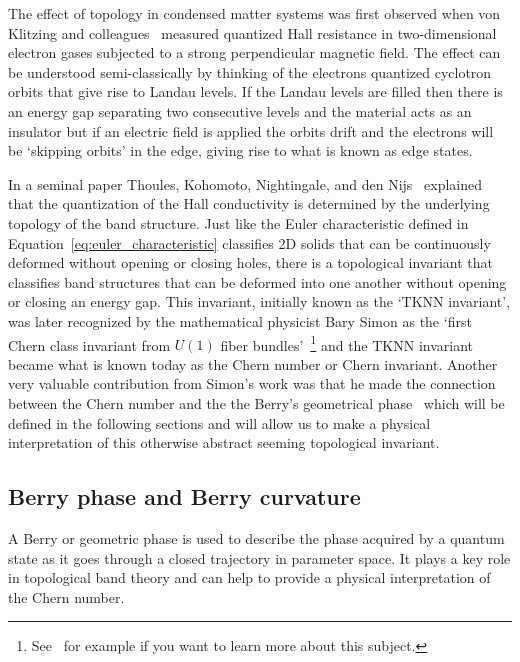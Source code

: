 The effect of topology in condensed matter systems was first observed when von Klitzing and colleagues~\cite{klitzing_new_1980} measured quantized Hall resistance in two-dimensional electron gases subjected to a strong perpendicular magnetic field. The effect can be understood semi-classically by thinking of the electrons quantized cyclotron orbits that give rise to Landau levels. If the Landau levels are filled then there is an energy gap separating two consecutive levels and the material acts as an insulator but if an electric field is applied the orbits drift and the electrons will be `skipping orbits' in the edge, giving rise to what is known as edge states. 

In a seminal paper Thoules, Kohomoto, Nightingale, and den Nijs~\cite{thouless_quantized_1982} explained that the quantization of the Hall conductivity is determined by the underlying topology of the band structure. Just like the Euler characteristic defined in Equation~\ref{eq:euler_characteristic} classifies 2D solids that can be continuously deformed without opening or closing holes, there is a topological invariant that classifies band structures that can be deformed into one another without opening or closing an energy gap. This invariant, initially known as the `TKNN invariant', was later recognized by the mathematical physicist Bary Simon as the `first Chern class invariant from $U(1)$ fiber bundles'~\cite{simon_holonomy_1983}\footnote{See~\cite{geometry_topology_physics} for example if you want to learn more about this subject.} and the TKNN invariant became what is known today as the Chern number or Chern invariant. Another very valuable contribution from Simon's work was that he made the connection between the Chern number and the the Berry's geometrical phase~\cite{berry_michael_victor_quantal_1984} which will be defined in the following sections and will allow us to make a physical interpretation of this otherwise abstract seeming topological invariant. 

\subsection{Berry phase and Berry curvature}

A Berry or geometric phase is used to describe the phase acquired by a quantum state as it goes through a closed trajectory in parameter space. It plays a key role in topological band theory and can help to provide a physical interpretation of the Chern number. 

